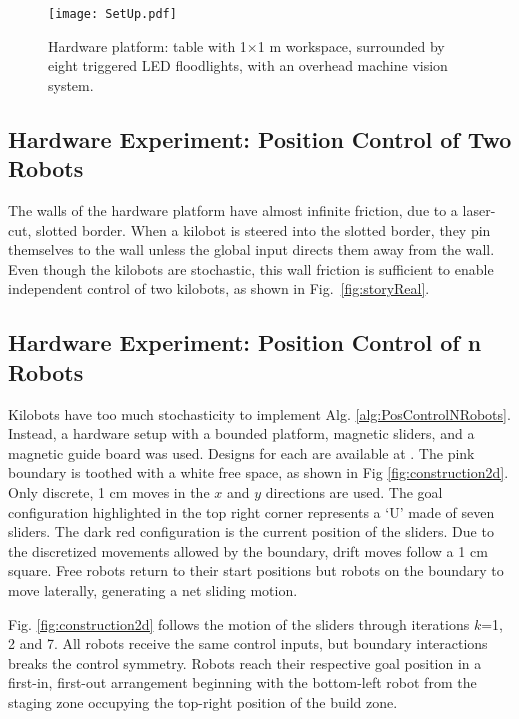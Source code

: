 \begin{figure}
\begin{center}
	\texttt{[image: SetUp.pdf]}
\end{center}
\vspace{-1em}
\caption{\label{fig:setup}
Hardware platform:  table with 1$\times$1 m workspace, surrounded by eight  triggered LED floodlights, with an overhead machine vision system.
}
\vspace{-1em}
\end{figure}
\subsection{Hardware Experiment: Position Control of Two Robots}
The walls of the hardware platform have almost infinite friction, due to a laser-cut, slotted border. When a kilobot is steered into the slotted border, they pin themselves to the wall unless the global input directs them away from the wall.  Even though the kilobots are stochastic, this wall friction is sufficient to enable independent control of two kilobots, as shown in Fig.~\ref{fig:storyReal}.

\subsection{Hardware Experiment: Position Control of n Robots}
Kilobots have too much stochasticity to implement Alg. \ref{alg:PosControlNRobots}. Instead, a hardware setup with a bounded platform, magnetic sliders, and a magnetic guide board was used.  Designs for each are available at \citep{arunhardware}. The pink boundary is toothed with a white free space, as shown in Fig \ref{fig:construction2d}. Only discrete, 1 cm moves in the $x$ and $y$ directions are used. The goal configuration highlighted in the top right corner represents a `U' made of seven sliders. The dark red configuration is the current position of the sliders. 
Due to the discretized movements allowed by the boundary, drift moves follow a 1 cm square.  Free robots return to their start positions but robots on the boundary to move laterally, generating a net sliding motion.

Fig. \ref{fig:construction2d} follows the motion of the sliders through iterations  $k$=1, 2 and 7. All robots receive the same control inputs, but boundary interactions breaks the control symmetry.  Robots reach their respective goal position in a first-in, first-out arrangement beginning with the bottom-left robot from the staging zone occupying the top-right position of the build zone.

